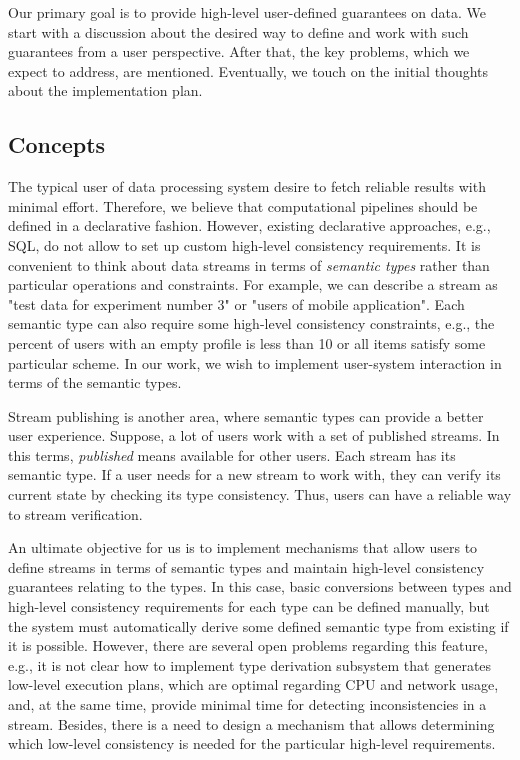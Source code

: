 \label{fs-phd-reliable}

Our primary goal is to provide high-level user-defined guarantees on data. We start with a discussion about the desired way to define and work with such guarantees from a user perspective. After that, the key problems, which we expect to address, are mentioned. Eventually, we touch on the initial thoughts about the implementation plan.

\subsection{Concepts}

The typical user of data processing system desire to fetch reliable results with minimal effort. Therefore, we believe that computational pipelines should be defined in a declarative fashion. However, existing declarative approaches, e.g., SQL, do not allow to set up custom high-level consistency requirements. It is convenient to think about data streams in terms of {\em semantic types} rather than particular operations and constraints. For example, we can describe a stream as "test data for experiment number 3" or "users of mobile application". Each semantic type can also require some high-level consistency constraints, e.g., the percent of users with an empty profile is less than 10 or all items satisfy some particular scheme. In our work, we wish to implement user-system interaction in terms of the semantic types.

Stream publishing is another area, where semantic types can provide a better user experience. Suppose, a lot of users work with a set of published streams. In this terms, {\em published} means available for other users. Each stream has its semantic type. If a user needs for a new stream to work with, they can verify its current state by checking its type consistency. Thus, users can have a reliable way to stream verification.

An ultimate objective for us is to implement mechanisms that allow users to define streams in terms of semantic types and maintain high-level consistency guarantees relating to the types. In this case, basic conversions between types and high-level consistency requirements for each type can be defined manually, but the system must automatically derive some defined semantic type from existing if it is possible. However, there are several open problems regarding this feature, e.g., it is not clear how to implement type derivation subsystem that generates low-level execution plans, which are optimal regarding CPU and network usage, and, at the same time, provide minimal time for detecting inconsistencies in a stream. Besides, there is a need to design a mechanism that allows determining which low-level consistency is needed for the particular high-level requirements.  

